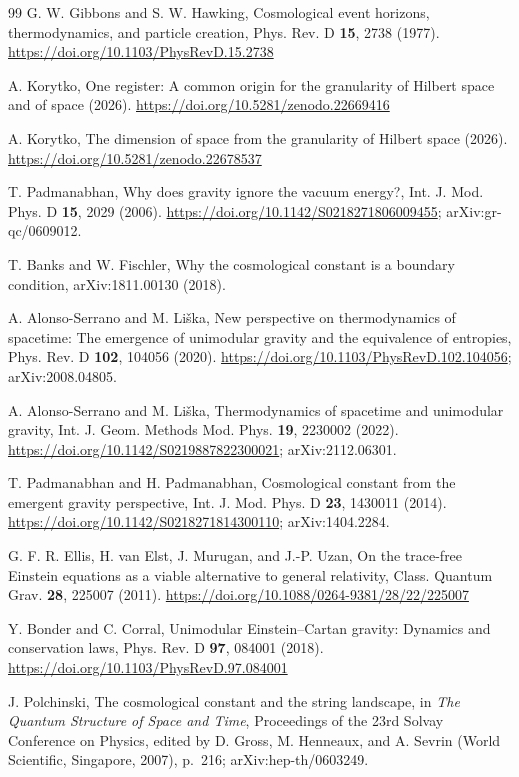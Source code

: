 \documentclass[aps,prd,twocolumn,superscriptaddress,nofootinbib,showkeys]{revtex4-2}
\begin{document}
\begin{thebibliography}{99}
 G. W. Gibbons and S. W. Hawking, Cosmological event horizons, thermodynamics, and particle creation, Phys. Rev. D \textbf{15}, 2738 (1977). \url{https://doi.org/10.1103/PhysRevD.15.2738}

 A. Korytko, One register: A common origin for the granularity of Hilbert space and of space (2026). \url{https://doi.org/10.5281/zenodo.22669416}

 A. Korytko, The dimension of space from the granularity of Hilbert space (2026). \url{https://doi.org/10.5281/zenodo.22678537}

 T. Padmanabhan, Why does gravity ignore the vacuum energy?, Int. J. Mod. Phys. D \textbf{15}, 2029 (2006). \url{https://doi.org/10.1142/S0218271806009455}; arXiv:gr-qc/0609012.

 T. Banks and W. Fischler, Why the cosmological constant is a boundary condition, arXiv:1811.00130 (2018).

 A. Alonso-Serrano and M. Li\v{s}ka, New perspective on thermodynamics of spacetime: The emergence of unimodular gravity and the equivalence of entropies, Phys. Rev. D \textbf{102}, 104056 (2020). \url{https://doi.org/10.1103/PhysRevD.102.104056}; arXiv:2008.04805.

 A. Alonso-Serrano and M. Li\v{s}ka, Thermodynamics of spacetime and unimodular gravity, Int. J. Geom. Methods Mod. Phys. \textbf{19}, 2230002 (2022). \url{https://doi.org/10.1142/S0219887822300021}; arXiv:2112.06301.

 T. Padmanabhan and H. Padmanabhan, Cosmological constant from the emergent gravity perspective, Int. J. Mod. Phys. D \textbf{23}, 1430011 (2014). \url{https://doi.org/10.1142/S0218271814300110}; arXiv:1404.2284.

 G. F. R. Ellis, H. van Elst, J. Murugan, and J.-P. Uzan, On the trace-free Einstein equations as a viable alternative to general relativity, Class. Quantum Grav. \textbf{28}, 225007 (2011). \url{https://doi.org/10.1088/0264-9381/28/22/225007}

 Y. Bonder and C. Corral, Unimodular Einstein--Cartan gravity: Dynamics and conservation laws, Phys. Rev. D \textbf{97}, 084001 (2018). \url{https://doi.org/10.1103/PhysRevD.97.084001}

 J. Polchinski, The cosmological constant and the string landscape, in \emph{The Quantum Structure of Space and Time}, Proceedings of the 23rd Solvay Conference on Physics, edited by D. Gross, M. Henneaux, and A. Sevrin (World Scientific, Singapore, 2007), p.~216; arXiv:hep-th/0603249.


\end{thebibliography}
\end{document}
